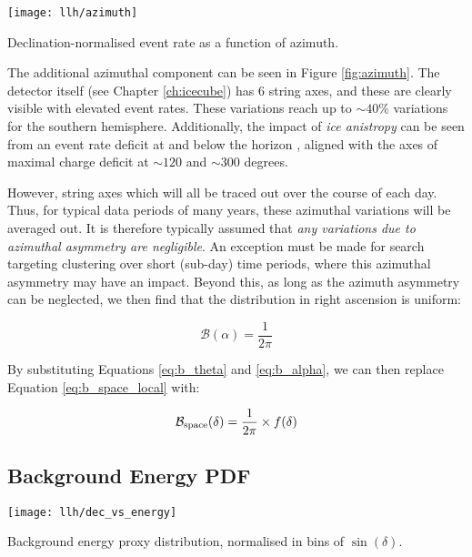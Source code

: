 \begin{marginfigure}
	\centering \texttt{[image: llh/azimuth]}
	\caption{Declination-normalised event rate as a function of azimuth.}
	\label{fig:azimuth}
\end{marginfigure}

The additional azimuthal component can be seen in Figure \ref{fig:azimuth}. The detector itself (see Chapter \ref{ch:icecube}) has 6 string axes, and these are clearly visible with elevated event rates. These variations reach up to $\sim40\%$ variations for the southern hemisphere. Additionally, the impact of \emph{ice anistropy} can be seen from an event rate deficit at and below the horizon , aligned with the axes of maximal charge deficit at $\sim 120$ and $\sim 300$ degrees. 

However, string axes which will all be traced out over the course of each day. Thus, for typical data periods of many years, these azimuthal variations will be averaged out. It is therefore typically assumed that \emph{any variations due to azimuthal asymmetry are negligible}.  An exception must be made for search targeting clustering over short (sub-day) time periods, where this azimuthal asymmetry may have an impact. Beyond this, as long as the azimuth asymmetry can be neglected, we then find that the distribution in right ascension is uniform:

\begin{equation}
	\mathcal{B} (\alpha) = \frac{1}{2\pi}
	\label{eq:b_alpha}
\end{equation}

By substituting Equations \ref{eq:b_theta} and \ref{eq:b_alpha}, we can then replace Equation \ref{eq:b_space_local} with:

\begin{equation}
	\mathcal{B}_{\textup{space}} (\delta) = \frac{1}{2\pi} \times f(\delta)
	\label{eq:b_space}
\end{equation}

\subsection{Background Energy PDF}

\begin{marginfigure}
	\centering \texttt{[image: llh/dec\_vs\_energy]}
	\caption{Background energy proxy distribution, normalised in bins of $\sin(\delta)$.}
	\label{fig:dec_vs_energy}
\end{marginfigure}

